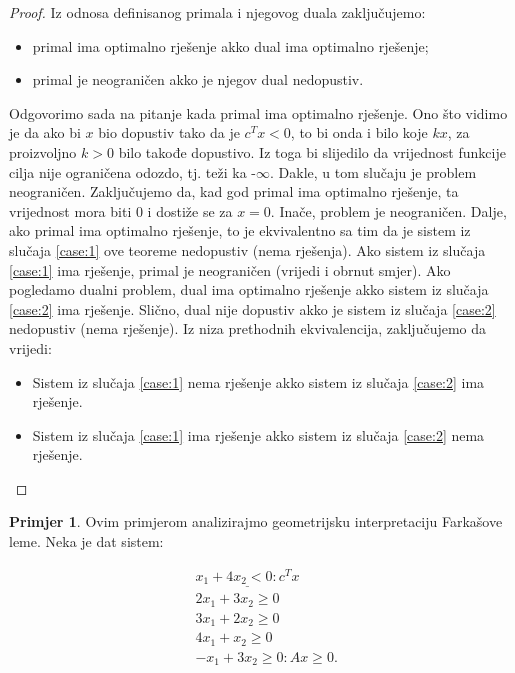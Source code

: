\documentclass[b5paper, utf8, 11pt, colorlinks]{book}
\theoremstyle{definition}
\newtheorem{primjer}{Primjer}[chapter]
\begin{document}
\begin{proof}
	Iz odnosa definisanog primala i njegovog duala zaključujemo:
	\begin{itemize}
		\item primal ima optimalno rješenje akko  dual ima optimalno rješenje; 
		\item primal je neograničen  akko je njegov dual nedopustiv.  
	\end{itemize}
	Odgovorimo sada na pitanje kada primal ima optimalno rješenje. Ono što vidimo je da ako bi $x$ bio dopustiv tako da je $c^Tx < 0$,  to bi onda i bilo koje $kx$, za proizvoljno $k>0$ bilo takođe dopustivo. Iz toga bi slijedilo da vrijednost funkcije cilja nije ograničena odozdo, tj. teži ka -$\infty$. Dakle, u tom slučaju je problem neograničen. Zaključujemo da, kad god  primal ima optimalno rješenje, ta vrijednost mora biti 0 i dostiže se za $x =0$. Inače, problem je neograničen. Dalje, ako primal ima optimalno rješenje, to  je ekvivalentno sa tim da je sistem iz slučaja  \ref{case:1} ove teoreme nedopustiv (nema rješenja).  Ako sistem iz slučaja  \ref{case:1}  ima rješenje, primal je neograničen (vrijedi i obrnut smjer). Ako pogledamo   dualni problem, dual ima optimalno rješenje akko sistem iz  slučaja  \ref{case:2}   ima rješenje. Slično, dual nije dopustiv akko je sistem iz  slučaja   \ref{case:2}  nedopustiv (nema rješenje). Iz niza prethodnih ekvivalencija, zaključujemo da vrijedi: 
	\begin{itemize}
		\item Sistem iz  slučaja  \ref{case:1}  nema rješenje akko sistem iz  slučaja  \ref{case:2}   ima rješenje. 
		\item Sistem iz  slučaja  \ref{case:1}  ima rješenje akko sistem iz  slučaja  \ref{case:2}  nema rješenje. 
	\end{itemize}
\end{proof}

\begin{primjer}
	Ovim primjerom analizirajmo geometrijsku interpretaciju Farkašove leme. Neka je dat sistem:
\end{primjer}

\begin{align*}
	& \underline{x_1 + 4 x_2  < 0: c^T x}\\  
	& 2 x_1 + 3 x_2 \geq 0 \\
	& 3 x_1 + 2 x_2 \geq 0 \\
	& 4 x_1 + x_2 \geq 0 \\
	& -x_1 + 3 x_2 \geq 0: Ax \geq 0.
\end{align*}
\end{document}
